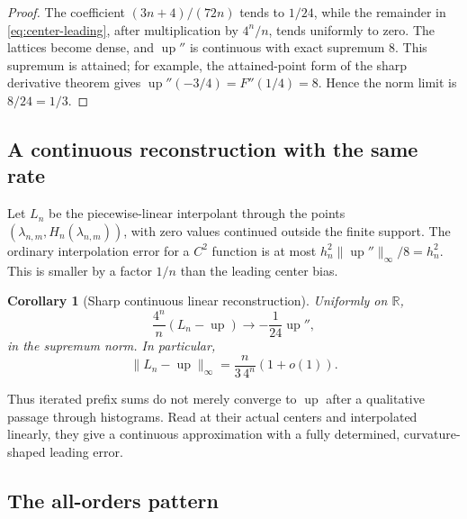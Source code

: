 \documentclass[11pt,oneside]{article}
\newtheorem{corollary}[theorem]{Corollary}
\theoremstyle{definition}
\theoremstyle{remark}
\newcommand{\R}{\mathbb R}
\newcommand{\Up}{\operatorname{up}}
\begin{document}
\begin{proof}
The coefficient $(3n+4)/(72n)$ tends to $1/24$, while the remainder in
\eqref{eq:center-leading}, after multiplication by $4^n/n$, tends uniformly to zero.  The
lattices become dense, and $\Up''$ is continuous with exact supremum $8$.  This supremum
is attained; for example, the attained-point form of the sharp derivative theorem gives
$\Up''(-3/4)=F''(1/4)=8$.  Hence the norm limit is $8/24=1/3$.
\end{proof}

\subsection{A continuous reconstruction with the same rate}

Let $L_n$ be the piecewise-linear interpolant through the points
$(\lambda_{n,m},H_n(\lambda_{n,m}))$, with zero values continued outside the finite support.
The ordinary interpolation error for a $C^2$ function is at most
$h_n^2\|\Up''\|_\infty/8=h_n^2$.  This is smaller by a factor $1/n$ than the leading
center bias.

\begin{corollary}[Sharp continuous linear reconstruction]
\label{cor:linear-rate}
Uniformly on $\R$,
\begin{equation}
 \frac{4^n}{n}(L_n-\Up)\longrightarrow-\frac1{24}\Up'',   \label{eq:linear-profile}
\end{equation}
in the supremum norm.  In particular,
\begin{equation}
 \|L_n-\Up\|_\infty=\frac n{3\,4^n}(1+o(1)).              \label{eq:linear-sharp}
\end{equation}
\end{corollary}

Thus iterated prefix sums do not merely converge to $\Up$ after a qualitative passage through
histograms.  Read at their actual centers and interpolated linearly, they give a continuous
approximation with a fully determined, curvature-shaped leading error.

\subsection{The all-orders pattern}
\end{document}
